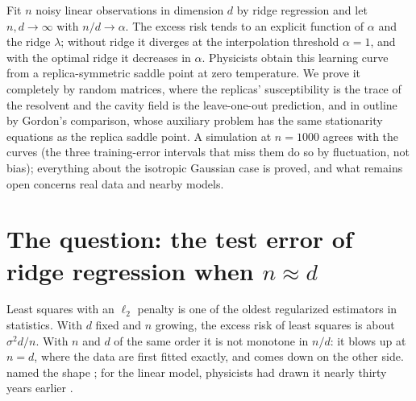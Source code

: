 \begin{refsection}

\newcommand{\ridgeR}{\mathcal{R}}

\begin{chaptersummary}
Fit $n$ noisy linear observations in dimension $d$ by ridge regression and let $n,d\to\infty$ with $n/d\to\alpha$. The excess risk tends to an explicit function of $\alpha$ and the ridge $\lambda$; without ridge it diverges at the interpolation threshold $\alpha=1$, and with the optimal ridge it decreases in $\alpha$. Physicists obtain this learning curve from a replica-symmetric saddle point at zero temperature. We prove it completely by random matrices, where the replicas' susceptibility is the trace of the resolvent and the cavity field is the leave-one-out prediction, and in outline by Gordon's comparison, whose auxiliary problem has the same stationarity equations as the replica saddle point. A simulation at $n=1000$ agrees with the curves (the three training-error intervals that miss them do so by fluctuation, not bias); everything about the isotropic Gaussian case is proved, and what remains open concerns real data and nearby models.
\end{chaptersummary}

\section{The question: the test error of ridge regression when \texorpdfstring{$n\approx d$}{n = d}}\label{sec:ridge:question}

Least squares with an $\ell_2$ penalty is one of the oldest regularized estimators in statistics. With $d$ fixed and $n$ growing, the excess risk of least squares is about $\sigma^2d/n$. With $n$ and $d$ of the same order it is not monotone in $n/d$: it blows up at $n=d$, where the data are first fitted exactly, and comes down on the other side. \textcite{BelkinEtAl2019} named the shape ; for the linear model, physicists had drawn it nearly thirty years earlier \parencite{KroghHertz1991,LoogEtAl2020}.


\end{refsection}
